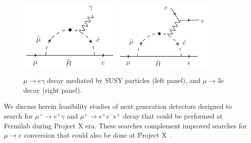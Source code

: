 \begin{figure}[htbp]
\begin{center}
\includegraphics[width=5cm]{Figures/mu_e_gamma_diagram.pdf} \hspace*{2cm}
\includegraphics[width=5cm]{Figures/mu_3e_diagram.pdf}
\caption{\label{CL:mutoegamma}$\mu \rightarrow e\gamma$ decay mediated by SUSY particles (left panel), and $\mu \rightarrow 3e$ decay (right panel).}
\end{center}
\end{figure}

We discuss herein feasibility studies of next generation detectors designed to search for $\mu^+\to e^+\gamma$ and $\mu^+\to e^+e^-e^+$ decay that could be performed at Fermilab during Project X era. These searches complement improved searches for $\mu \to e$ conversion that could also be done at Project X~\cite{Mu2eII}.



